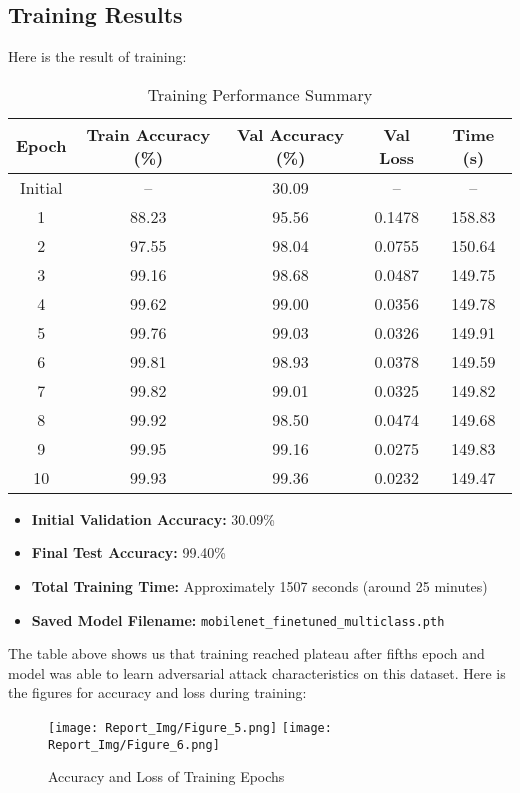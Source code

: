 \documentclass[a4paper,12pt]{report}
\begin{document}
\subsection{Training Results}
Here is the result of training:

\begin{table}[H]
\centering
\caption{Training Performance Summary}
\begin{tabular}{|c|c|c|c|c|}
\hline
Epoch & Train Accuracy (\%) & Val Accuracy (\%) & Val Loss & Time (s) \\
\hline
Initial & -- & 30.09 & -- & -- \\
1  & 88.23 & 95.56 & 0.1478 & 158.83 \\
2  & 97.55 & 98.04 & 0.0755 & 150.64 \\
3  & 99.16 & 98.68 & 0.0487 & 149.75 \\
4  & 99.62 & 99.00 & 0.0356 & 149.78 \\
5  & 99.76 & 99.03 & 0.0326 & 149.91 \\
6  & 99.81 & 98.93 & 0.0378 & 149.59 \\
7  & 99.82 & 99.01 & 0.0325 & 149.82 \\
8  & 99.92 & 98.50 & 0.0474 & 149.68 \\
9  & 99.95 & 99.16 & 0.0275 & 149.83 \\
10 & 99.93 & 99.36 & 0.0232 & 149.47 \\
\hline
\end{tabular}
\label{tab:training_results}
\end{table}
\begin{itemize}
    \item \textbf{Initial Validation Accuracy:} 30.09\%
    \item \textbf{Final Test Accuracy:} 99.40\%
    \item \textbf{Total Training Time:} Approximately 1507 seconds (around 25 minutes)
    \item \textbf{Saved Model Filename:} \texttt{mobilenet\_finetuned\_multiclass.pth}
\end{itemize}


The table above shows us that training reached plateau after fifths epoch and model was able to learn adversarial attack characteristics on this dataset. Here is the figures for accuracy and loss during training:

\begin{figure}[!htb]
  \texttt{[image: Report\_Img/Figure\_5.png]}
\endminipage\hfill
{}
  \texttt{[image: Report\_Img/Figure\_6.png]}
\endminipage\hfill
  \caption{Accuracy and Loss of Training Epochs}\label{fig:awesome_image1}
\end{figure}
\end{document}
